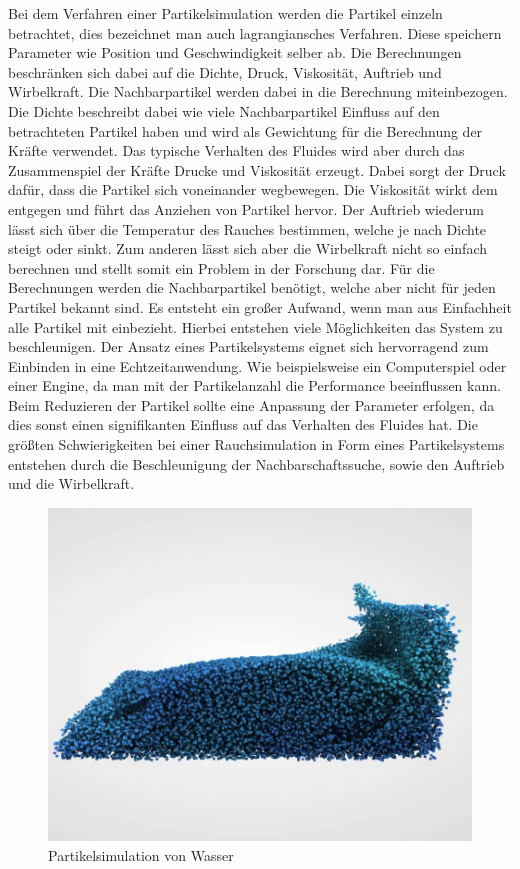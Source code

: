 \documentclass[intern,palatino]{cgBA}
\begin{document}
Bei dem Verfahren einer Partikelsimulation werden die Partikel einzeln betrachtet, dies bezeichnet man auch lagrangiansches Verfahren. Diese speichern Parameter wie Position und Geschwindigkeit selber ab. Die Berechnungen beschränken sich dabei auf die Dichte, Druck, Viskosität, Auftrieb und Wirbelkraft.
Die Nachbarpartikel werden dabei in die Berechnung miteinbezogen. Die Dichte beschreibt dabei wie viele Nachbarpartikel Einfluss auf den betrachteten Partikel haben und wird als Gewichtung für die Berechnung der Kräfte verwendet. Das typische Verhalten des Fluides wird aber durch das Zusammenspiel der Kräfte Drucke und Viskosität erzeugt. Dabei sorgt der Druck dafür, dass die Partikel sich voneinander wegbewegen. Die Viskosität wirkt dem entgegen und führt das Anziehen von Partikel hervor. Der Auftrieb wiederum lässt sich über die Temperatur des Rauches bestimmen, welche je nach Dichte steigt oder sinkt. Zum anderen lässt sich aber die Wirbelkraft nicht so einfach berechnen und stellt somit ein Problem in der Forschung dar.
Für die Berechnungen werden die Nachbarpartikel benötigt, welche aber nicht für jeden Partikel bekannt sind. Es entsteht ein großer Aufwand, wenn man aus Einfachheit alle Partikel mit einbezieht. Hierbei entstehen viele Möglichkeiten das System zu beschleunigen.
\newline
Der Ansatz eines Partikelsystems eignet sich hervorragend zum Einbinden in eine Echtzeitanwendung. Wie beispielsweise ein Computerspiel oder einer Engine, da man mit der Partikelanzahl  die Performance beeinflussen kann. Beim Reduzieren der Partikel sollte eine Anpassung der Parameter erfolgen, da dies sonst einen signifikanten Einfluss auf das Verhalten des Fluides hat.
\newline
Die größten Schwierigkeiten bei einer Rauchsimulation in Form eines Partikelsystems entstehen durch die Beschleunigung der Nachbarschaftssuche, sowie den Auftrieb und die Wirbelkraft.
\begin{figure}[h]
	\centering
	\includegraphics[width=0.7\columnwidth]{Bilder/partikelsystem.jpg}
	\caption[Partikelsimulation von Wasser \newline \url{https://i.ytimg.com/vi/DhNt_A3k4B4/maxresdefault.jpg}]{Partikelsimulation von Wasser}
	\label{img:Partikelsystem}
\end{figure}
\end{document}
